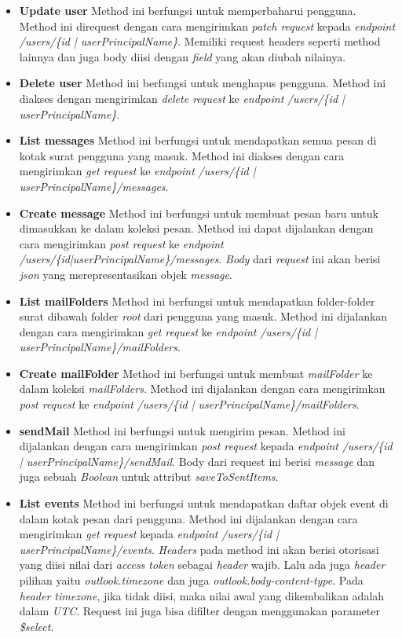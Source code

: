 \begin{itemize}
	\item \textbf{Update user}
	Method ini berfungsi untuk memperbaharui pengguna. Method ini direquest dengan cara mengirimkan \textit{patch request} kepada \textit{endpoint} \textit{/users/\{id | userPrincipalName\}}. Memiliki request headers seperti method lainnya dan juga body diisi dengan \textit{field} yang akan diubah nilainya. 
	\item \textbf{Delete user}
	Method ini berfungsi untuk menghapus pengguna. Method ini diakses dengan mengirimkan \textit{delete request} ke \textit{endpoint} \textit{/users/\{id | userPrincipalName\}}. 
	\item \textbf{List messages}
	Method ini berfungsi untuk mendapatkan semua pesan di kotak surat pengguna yang masuk. Method ini diakses dengan cara mengirimkan \textit{get request} ke \textit{endpoint} \textit{/users/\{id | userPrincipalName\}/messages}. 
	\item \textbf{Create message}
	Method ini berfungsi untuk membuat pesan baru untuk dimasukkan ke dalam koleksi pesan. Method ini dapat dijalankan dengan cara mengirimkan \textit{post request} ke \textit{endpoint} \textit{/users/\{id|userPrincipalName\}/messages}. \textit{Body} dari \textit{request} ini akan berisi \textit{json} yang merepresentasikan objek \textit{message}. 
	\item \textbf{List mailFolders}
	Method ini berfungsi untuk mendapatkan folder-folder surat dibawah folder \textit{root} dari pengguna yang masuk. Method ini dijalankan dengan cara mengirimkan \textit{get request} ke \textit{endpoint} \textit{/users/\{id | userPrincipalName\}/mailFolders}.
	\item \textbf{Create mailFolder}
	Method ini berfungsi untuk membuat \textit{mailFolder} ke dalam koleksi \textit{mailFolders}. Method ini dijalankan dengan cara mengirimkan \textit{post request} ke \textit{endpoint} \textit{/users/\{id | userPrincipalName\}/mailFolders}. 
	\item \textbf{sendMail}
	Method ini berfungsi untuk mengirim pesan. Method ini dijalankan dengan cara mengirimkan \textit{post request} kepada \textit{endpoint} \textit{/users/\{id | userPrincipalName\}/sendMail}. Body dari request ini berisi \textit{message} dan juga sebuah \textit{Boolean} untuk attribut \textit{saveToSentItems}.
	\item \textbf{List events}
	Method ini berfungsi untuk mendapatkan daftar objek event di dalam kotak pesan dari pengguna. Method ini dijalankan dengan cara mengirimkan \textit{get request} kepada \textit{endpoint} \textit{/users/\{id | userPrincipalName\}/events}. \textit{Headers} pada method ini akan berisi otorisasi yang diisi nilai dari \textit{access token} sebagai \textit{header} wajib. Lalu ada juga \textit{header} pilihan yaitu \textit{outlook.timezone} dan juga \textit{outlook.body-content-type}. Pada \textit{header timezone}, jika tidak diisi, maka nilai awal yang dikembalikan adalah dalam \textit{UTC}. Request ini juga bisa difilter dengan menggunakan parameter \textit{\$select}. 

\end{itemize}
